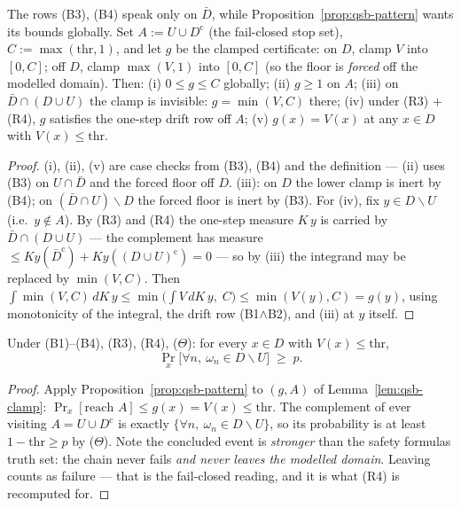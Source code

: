 \begin{blemma}
\label{lem:qsb-clamp}
The rows (B3), (B4) speak only on $\bar{D}$, while
Proposition~\ref{prop:qsb-pattern} wants its bounds globally. Set
$A := U \cup D^{\mathrm{c}}$ (the fail-closed stop set),
$C := \max(\mathrm{thr}, 1)$, and let $g$ be the clamped certificate:
on $D$, clamp $V$ into $[0, C]$; off $D$, clamp $\max(V, 1)$ into
$[0,C]$ (so the floor is \emph{forced} off the modelled domain). Then:
(i) $0 \le g \le C$ globally; (ii) $g \ge 1$ on $A$; (iii) on
$\bar{D} \cap (D \cup U)$ the clamp is invisible:
$g = \min(V, C)$ there; (iv) under (R3) $+$ (R4), $g$ satisfies the
one-step drift row off $A$; (v) $g(x) = V(x)$ at any
$x \in D$ with $V(x) \le \mathrm{thr}$.
\end{blemma}
\begin{proof}
(i), (ii), (v) are case checks from (B3), (B4) and the definition ---
(ii) uses (B3) on $U \cap \bar D$ and the forced floor off $D$. (iii):
on $D$ the lower clamp is inert by (B4); on
$(\bar{D} \cap U) \smallsetminus D$ the forced floor is inert by (B3).
For (iv), fix $y \in D \smallsetminus U$ (i.e.\ $y \notin A$). By (R3)
and (R4) the one-step measure $K\,y$ is carried by
$\bar{D} \cap (D \cup U)$ --- the complement has measure
$\le K y (\bar D^{\mathrm c}) + K y ((D \cup U)^{\mathrm c}) = 0$ ---
so by (iii) the integrand may be replaced by $\min(V, C)$. Then
$\int \min(V, C)\,dK\,y \le \min\bigl(\int V\,dK\,y,\; C\bigr)
\le \min(V(y), C) = g(y)$, using monotonicity of the integral, the
drift row (B1$\wedge$B2), and (iii) at $y$ itself.
\end{proof}

\begin{bthm}\label{thm:qsb-failclosed}
Under (B1)--(B4), (R3), (R4), ($\Theta$): for every $x \in D$ with
$V(x) \le \mathrm{thr}$,
\[
\Pr_x\bigl[\forall n,\ \omega_n \in D \smallsetminus U\bigr] \;\ge\; p .
\]
\end{bthm}
\begin{proof}
Apply Proposition~\ref{prop:qsb-pattern} to $(g, A)$ of
Lemma~\ref{lem:qsb-clamp}:
$\Pr_x[\text{reach } A] \le g(x) = V(x) \le \mathrm{thr}$. The
complement of ever visiting $A = U \cup D^{\mathrm{c}}$ is exactly
$\{\forall n,\ \omega_n \in D \smallsetminus U\}$, so its probability is
at least $1 - \mathrm{thr} \ge p$ by ($\Theta$). Note the concluded
event is \emph{stronger} than the safety formula\textquotesingle s truth
set: the chain never fails \emph{and never leaves the modelled domain}.
Leaving counts as failure --- that is the fail-closed reading, and it is
what (R4) is recomputed for.
\end{proof}

